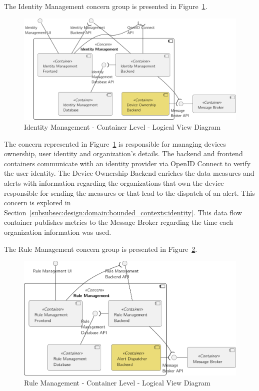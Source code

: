 The Identity Management concern group is presented in Figure~\ref{fig:design:architecture:platform:containers:logical:identity}.

\begin{figure}[H]
   \centering
   \includegraphics[page=1,width=0.9\columnwidth]{assets/diagrams/design/architectural/level2/logical/identity-management-context.pdf}
   \caption[Identity Management - Container Level - Logical View Diagram]{Identity Management - Container Level - Logical View Diagram}
   \label{fig:design:architecture:platform:containers:logical:identity}
\end{figure}

The concern represented in Figure~\ref{fig:design:architecture:platform:containers:logical:identity} is responsible for managing devices ownership, user identity and organization's details. The backend and frontend containers communicate with an identity provider via OpenID Connect to verify the user identity. The Device Ownership Backend enriches the data measures and alerts with information regarding the organizations that own the device responsible for sending the measures or that lead to the dispatch of an alert. This concern is explored in Section~\ref{subsubsec:design:domain:bounded_contexts:identity}. This data flow container publishes metrics to the Message Broker regarding the time each organization information was used.

The Rule Management concern group is presented in Figure~\ref{fig:design:architecture:platform:containers:logical:rule}.

\begin{figure}[H]
   \centering
   \includegraphics[page=1,width=0.8\columnwidth]{assets/diagrams/design/architectural/level2/logical/rule-management-context.pdf}
   \caption[Rule Management - Container Level - Logical View Diagram]{Rule Management - Container Level - Logical View Diagram}
   \label{fig:design:architecture:platform:containers:logical:rule}
\end{figure}

